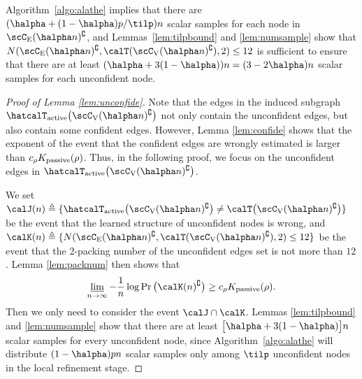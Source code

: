 \documentclass[11pt,onecolumn]{article}
\newcommand{\Passive}{{\rm passive}}
\newcommand{\Active}{{\rm active}}
\begin{document}
\begin{remark}
	 Algorithm~\ref{algo:alathe} implies that there are $(\halpha+(1-\halpha)p/\tilp)n$ scalar samples for each node in $\scC_{\mathrm{E}}(\halpha n)^{\complement}$, and Lemmas~\ref{lem:tilpbound} and \ref{lem:numsample} show that $N(\scC_{\mathrm{E}}(\halpha n)^{\complement},\calT(\scC_{\mathrm{V}}(\halpha n)^{\complement}),2)\leq 12$ is sufficient to ensure that there are at least $(\halpha+3(1-\halpha))n=(3-2\halpha)n$ scalar samples for each unconfident node.
\end{remark}
\begin{proof}[Proof of Lemma \ref{lem:unconfide}]
	Note that the edges in the induced subgraph $\hatcalT_{\Active}\big(\scC_{\mathrm{V}}(\halpha n)^{\complement}\big)$ not only contain the unconfident edges, but also contain some confident edges. However, Lemma \ref{lem:confide} shows that the exponent of the event that the confident edges are wrongly estimated is larger than $c_{\rho}K _{\Passive}(\rho)$. Thus, in the following proof, we focus on the unconfident edges in $\hatcalT_{\Active}\big(\scC_{\mathrm{V}}(\halpha n)^{\complement}\big)$.
	
	We set $\calJ(n)\triangleq\{\hatcalT_{\Active}\big(\scC_{\mathrm{V}}(\halpha n)^{\complement}\big)\neq \calT\big(\scC_{\mathrm{V}}(\halpha n)^{\complement}\big)\}$ be the event that the learned structure of unconfident nodes is wrong, and $\calK(n)\triangleq\{N(\scC_{\mathrm{E}}(\halpha n)^{\complement},\calT(\scC_{\mathrm{V}}(\halpha n)^{\complement}),2)\leq 12\}$ be 
	the event that the 2-packing number of the unconfident edges set is not more than  $12$. Lemma \ref{lem:packnum} then shows that 
	\begin{align}
		\varliminf_{n\rightarrow\infty}-\frac{1}{n}\log\Pr\big(\calK(n)^{\complement}\big)\geq c_{\rho}K _{\Passive}(\rho).
	\end{align}
	Then we only need to consider the event $\calJ\cap \calK$. Lemmas \ref{lem:tilpbound} and \ref{lem:numsample} show that there are at least $\big[\halpha+3(1-\halpha)\big]n$ scalar samples for every unconfident node, since Algorithm~\ref{algo:alathe} will distribute $(1-\halpha)pn$ scalar samples only among $\tilp$ unconfident nodes in the local refinement stage. 


\end{proof}
\end{document}
